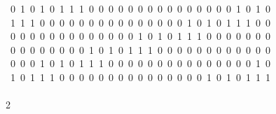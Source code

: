 \begin{tabbing}
\>\ 0\ 1\ 0\ 1\ 0\ 1\ 1\ 1\ 0\ 0\ 0\ 0\ 0\ 0\ 0\ 0\ 0\ 0\ 0\ 0\ 0\ 0\ 0\ 1\ 0\ 1\ 0\\[0pt]
\>\ 1\ 1\ 1\ 0\ 0\ 0\ 0\ 0\ 0\ 0\ 0\ 0\ 0\ 0\ 0\ 0\ 0\ 0\ 1\ 0\ 1\ 0\ 1\ 1\ 1\ 0\ 0\\[0pt]
\>\ 0\ 0\ 0\ 0\ 0\ 0\ 0\ 0\ 0\ 0\ 0\ 0\ 0\ 1\ 0\ 1\ 0\ 1\ 1\ 1\ 0\ 0\ 0\ 0\ 0\ 0\ 0\\[0pt]
\>\ 0\ 0\ 0\ 0\ 0\ 0\ 0\ 0\ 1\ 0\ 1\ 0\ 1\ 1\ 1\ 0\ 0\ 0\ 0\ 0\ 0\ 0\ 0\ 0\ 0\ 0\ 0\\[0pt]
\>\ 0\ 0\ 0\ 1\ 0\ 1\ 0\ 1\ 1\ 1\ 0\ 0\ 0\ 0\ 0\ 0\ 0\ 0\ 0\ 0\ 0\ 0\ 0\ 0\ 0\ 1\ 0\\[0pt]
\>\ 1\ 0\ 1\ 1\ 1\ 0\ 0\ 0\ 0\ 0\ 0\ 0\ 0\ 0\ 0\ 0\ 0\ 0\ 0\ 0\ 1\ 0\ 1\ 0\ 1\ 1\ 1\\[0pt]
\>\\[0pt]
2\>\end{tabbing}
